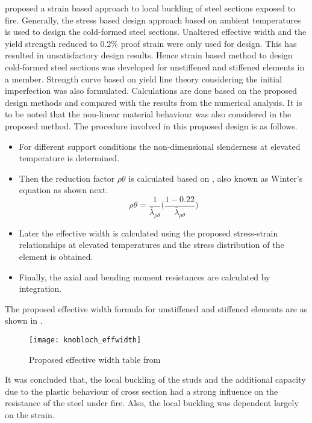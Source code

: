 \citet{Knobloch2006} proposed a strain based approach to local buckling of steel sections exposed to fire. Generally, the stress based design approach based on ambient temperatures is used to design the cold-formed steel sections. Unaltered effective width and the yield strength reduced to 0.2\% proof strain were only used for design. This has resulted in unsatisfactory design results. Hence strain based method to design cold-formed steel sections was developed for unstiffened and stiffened elements in a member. Strength curve based on yield line theory considering the initial imperfection was also formulated. Calculations are done based on the proposed design methods and compared with the results from the numerical analysis. It is to be noted that the non-linear material behaviour was also considered in the proposed method. The procedure involved in this proposed design is as follows. 
\begin{itemize}
	\item For different support conditions the non-dimensional slenderness   at elevated temperature is determined.
	\item Then the reduction factor $\rho\theta$  is calculated based on \citet{Desmond.1981},  also known as Winter’s equation as shown next.
	\begin{equation}
	\rho \theta = \dfrac{1}{\bar{\lambda}_{\rho \theta}}\Bigg(\dfrac{1-0.22}{\bar{\lambda}_{\rho \theta}}\Bigg) 
	\end{equation}
	\item Later the effective width is calculated using the proposed stress-strain relationships at elevated temperatures and the stress distribution of the element is obtained.
	\item Finally, the axial and bending moment resistances are calculated by integration.
\end{itemize}

The proposed effective width formula for unstiffened and stiffened elements are as shown in .

\begin{figure}[htbp]
	\centering
		\texttt{[image: knobloch\_effwidth]}		
		\caption{Proposed effective width table from \citet{Knobloch2006}}
			\label{fig:knobloch_effwidth}

	\end{figure}

It was concluded that, the local buckling of the studs and the additional capacity due to the plastic behaviour of cross section had a strong influence on the resistance of the steel under fire. Also, the local buckling was dependent largely on the strain. 

